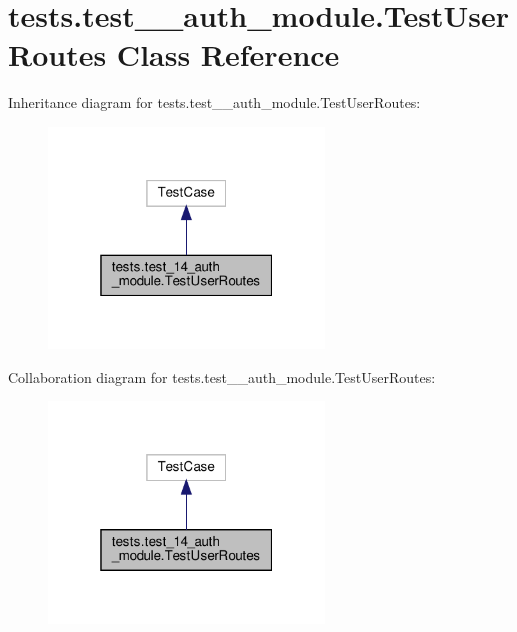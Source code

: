 \hypertarget{classtests_1_1test__14__auth__module_1_1_test_user_routes}{}\section{tests.\+test\+\_\+\_\+auth\+\_\+module.\+Test\+User\+Routes Class Reference}
\label{classtests_1_1test__14__auth__module_1_1_test_user_routes}


Inheritance diagram for tests.\+test\+\_\+\_\+auth\+\_\+module.\+Test\+User\+Routes\+:
\nopagebreak
\begin{figure}[H]
\begin{center}
\leavevmode
\includegraphics[width=208pt]{classtests_1_1test__14__auth__module_1_1_test_user_routes__inherit__graph}
\end{center}
\end{figure}


Collaboration diagram for tests.\+test\+\_\+\_\+auth\+\_\+module.\+Test\+User\+Routes\+:
\nopagebreak
\begin{figure}[H]
\begin{center}
\leavevmode
\includegraphics[width=208pt]{classtests_1_1test__14__auth__module_1_1_test_user_routes__coll__graph}
\end{center}
\end{figure}
